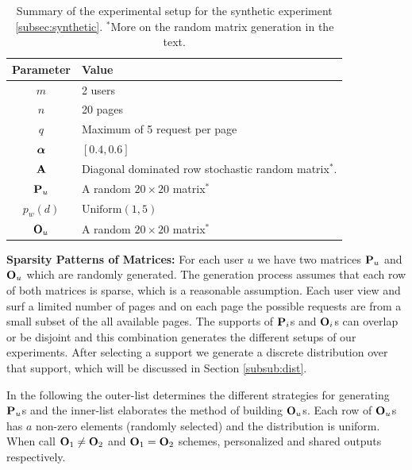 	\begin{table}
		\centering
		\begin{tabular}{|c|l|}
			\hline
			Parameter & Value \\ 
			\hline  
			$m$ & 2 users \\ \hline
			$n$ & 20 pages \\ \hline
			$q$ & Maximum of 5 request per page\\ \hline 
			\hline 
			$\aalpha$ & $[0.4, 0.6]$ \\ \hline 
			$\A$ & Diagonal dominated row stochastic random matrix$^*$. \\ \hline 
			$\P_u$ & A random $20 \times 20$ matrix$^*$ \\ \hline 			
			$p_w(d)$ & $\text{Uniform}(1,5)$ \\ \hline 
			$\O_u$ & A random $20 \times 20$ matrix$^*$ \\ \hline 
		\end{tabular}
		\caption{Summary of the experimental setup for the synthetic experiment \ref{subsec:synthetic}. $^*$More on the random matrix generation in the text.}
		\label{tab:toy}
	\end{table}
	
	{\bf Sparsity Patterns of Matrices:}
	\label{subsub:sparsity}
	For each user $u$ we have two matrices $\P_u$ and $\O_u$ which are randomly generated. 
	The generation process assumes that each row of both matrices is sparse, which is a reasonable assumption. 
	Each user view and surf a limited number of pages and on each page the possible requests are from a small subset of the all available pages. 
	The supports of $\P_i$s and $\O_i$s can overlap or be disjoint and this combination generates the different setups of our experiments.  
	After selecting a support we generate a discrete distribution over that support, which will be discussed in Section \ref{subsub:dist}.
	
	In the following the outer-list determines the different strategies for generating $\P_u$s and the inner-list elaborates the method of building $\O_u$s. 
	Each row of $\O_u$s has $a$ non-zero elements (randomly selected) and the distribution is uniform.
	When call $\O_1 \neq \O_2$ and $\O_1 = \O_2$ schemes, personalized and shared outputs respectively.
	
